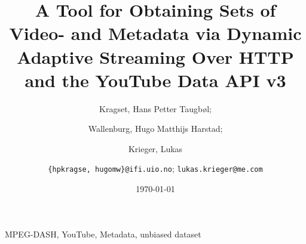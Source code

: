 \documentclass[10pt,journal]{IEEEtran}
\title{A Tool for Obtaining Sets of Video- and Metadata via Dynamic Adaptive
Streaming Over HTTP and the YouTube Data API v3}
\author{
    Kragset, Hans Petter Taugb\o l;
    \and
    Wallenburg, Hugo Matthijs Harstad;
    \and
    Krieger, Lukas
    \and
    \newline
    \texttt{\{hpkragse, hugomw\}@ifi.uio.no};
    \texttt{lukas.krieger@me.com}
}
\date{\today}
\begin{document}
\maketitle



\begin{IEEEkeywords}
    MPEG-DASH, YouTube, Metadata, unbiased dataset
\end{IEEEkeywords}





















\end{document}
